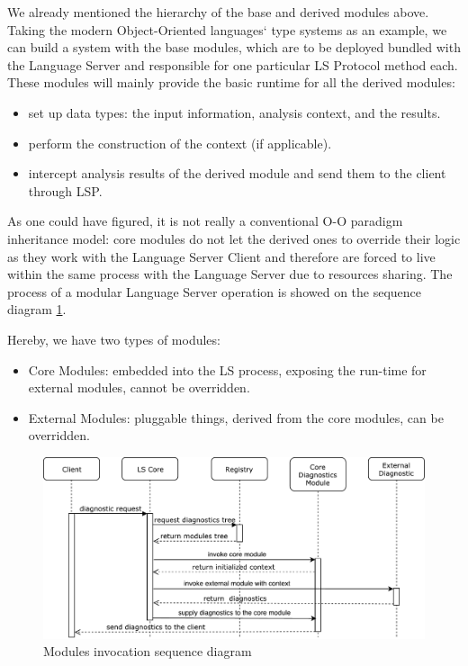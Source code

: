 We already mentioned the hierarchy of the base and derived modules above. Taking the modern Object-Oriented languages`
type systems as an example, we can build a system with the base modules, which are to be deployed bundled with the Language Server and responsible for
one particular LS Protocol method each. These modules will mainly provide the basic runtime for all the derived modules:
\begin{itemize}
    \item set up data types: the input information, analysis context, and the results.
    \item perform the construction of the context (if applicable).
    \item intercept analysis results of the derived module and send them to the client through LSP.
\end{itemize}

As one could have figured, it is not really a conventional O-O paradigm inheritance model: core modules do not let the derived ones to override their logic as they work with the Language Server Client and therefore
are forced to live within the same process with the Language Server due to resources sharing. The process of a modular Language Server operation is showed on the sequence diagram \ref{fig:met:modules_sd}.

Hereby, we have two types of modules:
\begin{itemize}
    \item Core Modules: embedded into the LS process, exposing the run-time for external modules, cannot be overridden.
    \item External Modules: pluggable things, derived from the core modules, can be overridden.
\end{itemize}

\begin{figure}[H]
    \centering
    \includegraphics[width=1.0\textwidth]{figs/modules_sd.pdf}
    \caption{Modules invocation sequence diagram}
    \label{fig:met:modules_sd}
\end{figure}

